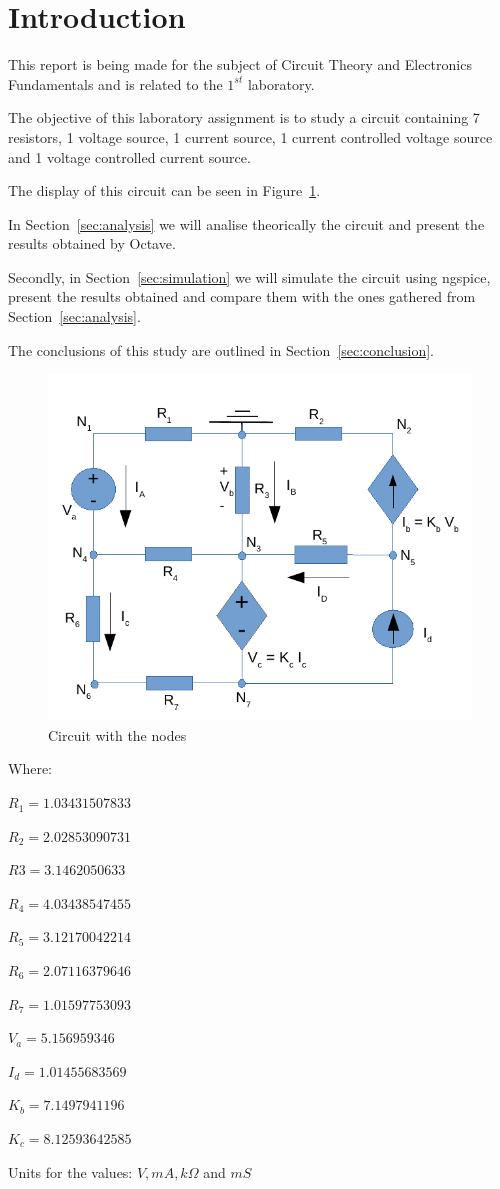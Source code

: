\section{Introduction}
\label{sec:introduction}


\hspace{0,5cm} This report is being made for the subject of Circuit Theory and Electronics Fundamentals and is related to the $1^{st}$ laboratory.

The objective of this laboratory assignment is to study a circuit containing 7 resistors, 1 voltage source, 1 current source, 1 current controlled voltage source and 1 voltage controlled current source.

The display of this circuit can be seen in Figure~\ref{fig:circuito}.

In Section~\ref{sec:analysis} we will analise theorically the circuit and present the results obtained by Octave.

Secondly, in Section~\ref{sec:simulation} we will simulate the circuit using ngspice, present the results obtained and compare them with the ones gathered from Section~\ref{sec:analysis}.

The conclusions of this study are outlined in Section~\ref{sec:conclusion}.

\begin{figure}[h] \centering
\includegraphics[width=0.7\linewidth]{circuito.pdf}
\caption{Circuit with the nodes} %
\label{fig:circuito}
\end{figure}


\begin{center}
Where:

$R_1 = 1.03431507833 $

$R_2 = 2.02853090731$
 
$R3 = 3.1462050633 $

$R_4 = 4.03438547455$ 

$R_5 = 3.12170042214 $

$R_6 = 2.07116379646 $

$R_7 = 1.01597753093 $

$V_a = 5.156959346 $

$I_d = 1.01455683569 $

$K_b = 7.1497941196 $

$K_c = 8.12593642585 $
\end{center}

Units for the values: $V, mA, k\Omega$ and $mS$



